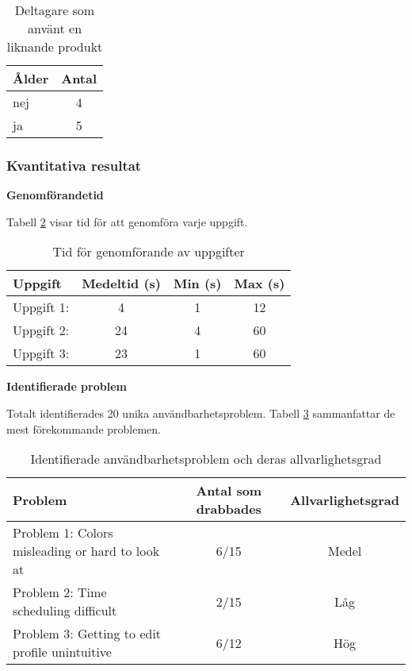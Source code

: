 \begin{table}[H]
\centering
\begin{tabular}{|l|c|}
\hline
\textbf{Ålder} & \textbf{Antal} \\
\hline
nej  & 4   \\
ja  & 5  \\
\hline
\end{tabular}
\caption{Deltagare som använt en liknande produkt}
\label{tab:exp1}
\end{table}



\subsubsection{Kvantitativa resultat}

\textbf{Genomförandetid}

Tabell \ref{tab:tid2} visar tid för att genomföra varje uppgift.

\begin{table}[h]
\centering
\begin{tabular}{|l|c|c|c|}
\hline
\textbf{Uppgift} & \textbf{Medeltid (s)} & \textbf{Min (s)} & \textbf{Max (s)} \\
\hline
Uppgift 1:  & 4 & 1 & 12 \\
Uppgift 2:  & 24 & 4 & 60\\
Uppgift 3:  & 23 & 1 & 60\\
\hline
\end{tabular}
\caption{Tid för genomförande av uppgifter}
\label{tab:tid2}
\end{table}


\textbf{Identifierade problem}

Totalt identifierades 20 unika användbarhetsproblem. Tabell \ref{tab:problem} sammanfattar de mest förekommande problemen.
\begin{table}[h]
\centering
\begin{tabular}{|p{6cm}|c|c|}
\hline
\textbf{Problem} & \textbf{Antal som drabbades} & \textbf{Allvarlighetsgrad} \\
\hline
Problem 1: Colors misleading or hard to look at & 6/15 & Medel\\
Problem 2: Time scheduling difficult & 2/15 &  Låg \\
Problem 3: Getting to edit profile unintuitive & 6/12 & Hög\\
\hline
\end{tabular}
\caption{Identifierade användbarhetsproblem och deras allvarlighetsgrad}
\label{tab:problem}
\end{table}


